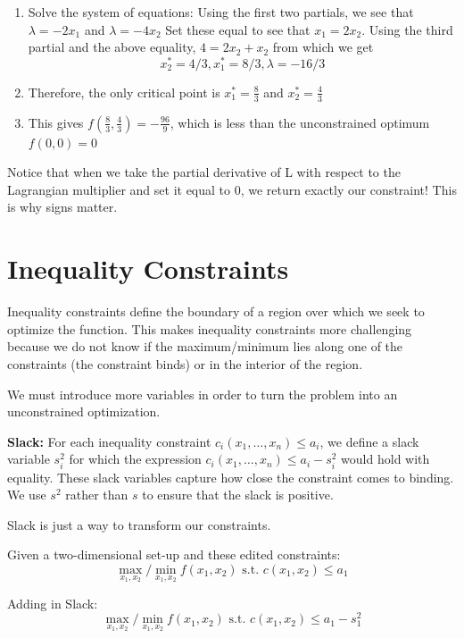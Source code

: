 \documentclass[]{book}
\theoremstyle{definition}
\theoremstyle{definition}
\theoremstyle{definition}
\theoremstyle{remark}
\begin{document}
\begin{enumerate}
\def\labelenumi{\arabic{enumi}.}
\setcounter{enumi}{2}
\item
  Solve the system of equations: Using the first two partials, we see
  that \(\lambda = -2x_1\) and \(\lambda = -4x_2\) Set these equal to
  see that \(x_1 = 2x_2\). Using the third partial and the above
  equality, \(4 = 2x_2 + x_2\) from which we get
  \[x_2^* = 4/3, x_1^* = 8/3, \lambda = -16/3\]
\item
  Therefore, the only critical point is \(x_1^* = \frac{8}{3}\) and
  \(x_2^* = \frac{4}{3}\)
\item
  This gives \(f(\frac{8}{3}, \frac{4}{3}) = -\frac{96}{9}\), which is
  less than the unconstrained optimum \(f(0,0) = 0\)
\end{enumerate}

Notice that when we take the partial derivative of L with respect to the
Lagrangian multiplier and set it equal to 0, we return exactly our
constraint! This is why signs matter.

\section{Inequality Constraints}\label{inequality-constraints}

Inequality constraints define the boundary of a region over which we
seek to optimize the function. This makes inequality constraints more
challenging because we do not know if the maximum/minimum lies along one
of the constraints (the constraint binds) or in the interior of the
region.

We must introduce more variables in order to turn the problem into an
unconstrained optimization.

\textbf{Slack:} For each inequality constraint
\(c_i(x_1, \dots, x_n) \leq a_i\), we define a slack variable \(s_i^2\)
for which the expression \(c_i(x_1, \dots, x_n) \leq a_i - s_i^2\) would
hold with equality. These slack variables capture how close the
constraint comes to binding. We use \(s^2\) rather than \(s\) to ensure
that the slack is positive.

Slack is just a way to transform our constraints.

Given a two-dimensional set-up and these edited constraints:
\[\max_{x_1,x_2}/\min_{x_1,x_2} f(x_1,x_2) \text{ s.t. } c(x_1,x_2) \le a_1\]

Adding in Slack:
\[\max_{x_1,x_2}/\min_{x_1,x_2} f(x_1,x_2) \text{ s.t. } c(x_1,x_2) \le a_1 - s_1^2\]
\end{document}
